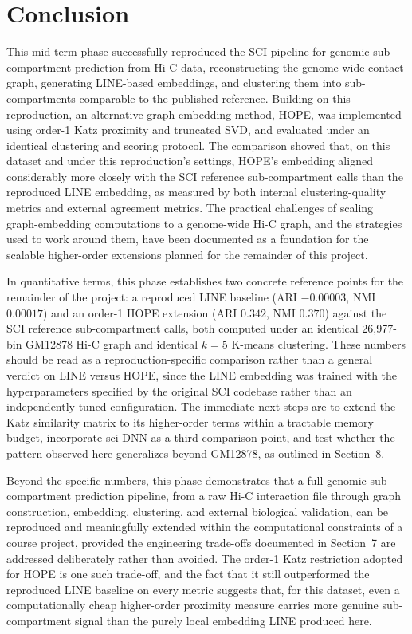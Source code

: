\documentclass[12pt]{article}
\begin{document}
\section{Conclusion}

This mid-term phase successfully reproduced the SCI pipeline for genomic sub-compartment
prediction from Hi-C data, reconstructing the genome-wide contact graph, generating LINE-based
embeddings, and clustering them into sub-compartments comparable to the published reference.
Building on this reproduction, an alternative graph embedding method, HOPE, was implemented
using order-1 Katz proximity and truncated SVD, and evaluated under an identical clustering and
scoring protocol. The comparison showed that, on this dataset and under this reproduction's
settings, HOPE's embedding aligned considerably more closely with the SCI reference
sub-compartment calls than the reproduced LINE embedding, as measured by both internal
clustering-quality metrics and external agreement metrics. The practical challenges of scaling
graph-embedding computations to a genome-wide Hi-C graph, and the strategies used to work
around them, have been documented as a foundation for the scalable higher-order extensions
planned for the remainder of this project.

In quantitative terms, this phase establishes two concrete reference points for the remainder of
the project: a reproduced LINE baseline (ARI $-0.00003$, NMI $0.00017$) and an order-1 HOPE
extension (ARI $0.342$, NMI $0.370$) against the SCI reference sub-compartment calls, both
computed under an identical 26,977-bin GM12878 Hi-C graph and identical $k=5$ K-means
clustering. These numbers should be read as a reproduction-specific comparison rather than a
general verdict on LINE versus HOPE, since the LINE embedding was trained with the hyperparameters
specified by the original SCI codebase rather than an independently tuned configuration. The
immediate next steps are to extend the Katz similarity matrix to its higher-order terms within a
tractable memory budget, incorporate sci-DNN as a third comparison point, and test whether the
pattern observed here generalizes beyond GM12878, as outlined in Section~8.

Beyond the specific numbers, this phase demonstrates that a full genomic sub-compartment
prediction pipeline, from a raw Hi-C interaction file through graph construction, embedding,
clustering, and external biological validation, can be reproduced and meaningfully extended
within the computational constraints of a course project, provided the engineering trade-offs
documented in Section~7 are addressed deliberately rather than avoided.
The order-1 Katz restriction adopted for HOPE is one such trade-off, and the fact that it still
outperformed the reproduced LINE baseline on every metric suggests that, for this dataset, even
a computationally cheap higher-order proximity measure carries more genuine sub-compartment
signal than the purely local embedding LINE produced here.
\end{document}
